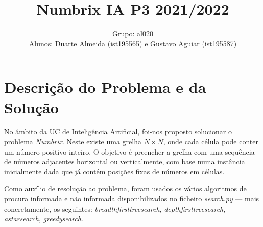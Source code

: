 \documentclass[12pt]{exam}
\author{Grupo: al020\\Alunos: Duarte Almeida (ist195565) e Gustavo Aguiar (ist195587)}
\title{Numbrix IA P3 2021/2022}
\date{}\date{}
\renewcommand\_{\textunderscore\linebreak[1]}
\begin{document}
    \maketitle
    \vspace{-6em}
    \section{Descrição do Problema e da Solução}
        \indent No âmbito da UC de Inteligência Artificial, foi-nos proposto solucionar o problema \textit{Numbrix}.
        Neste existe uma grelha \textbf{$N\times N$}, onde cada célula pode conter um número positivo inteiro.
        O objetivo é preencher a grelha com uma sequência de números adjacentes horizontal ou verticalmente, com base numa instância inicialmente
        dada que já contém posições fixas de números em células.

        \indent Como auxílio de resolução ao problema, foram usados os vários algoritmos de procura informada e não informada disponibilizados no ficheiro \textit{search.py} — mais concretamente, os seguintes: \textit{breadth\_first\_tree\_search}, \textit{depth\_first\_tree\_search}, \textit{astar\_search}, \textit{greedy\_search}.
\end{document}
